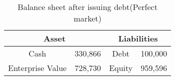 \begin{table}[ht]
\centering
\begin{tabular}{@{}cccc@{}}
\toprule
\multicolumn{2}{c}{Asset}  & \multicolumn{2}{c}{Liabilities} \\ \midrule
Cash             & 330,866 & Debt           & 100,000              \\
Enterprise Value & 728,730 & Equity         & 959,596        \\ \bottomrule
\end{tabular}
\caption{Balance sheet after issuing debt(Perfect market)}
\label{tab:bs_after_debt_perfect}
\end{table}
